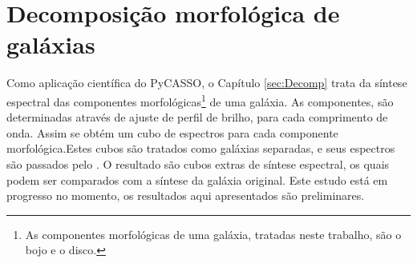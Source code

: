 
\section{Decomposição morfológica de galáxias}

Como aplicação científica do PyCASSO, o Capítulo \ref{sec:Decomp} trata da
síntese espectral das componentes morfológicas\footnote{As componentes
morfológicas de uma galáxia, tratadas neste trabalho, são o bojo e o disco.} de
uma galáxia. As componentes, são determinadas através de ajuste de perfil de
brilho, para cada comprimento de onda. Assim se obtém um cubo de espectros para
cada componente morfológica.Estes cubos são tratados como galáxias separadas, e
seus espectros são passados pelo \starlight. O resultado são cubos extras de
síntese espectral, os quais podem ser comparados com a síntese da galáxia
original. Este estudo está em progresso no momento, os resultados aqui
apresentados são preliminares.

